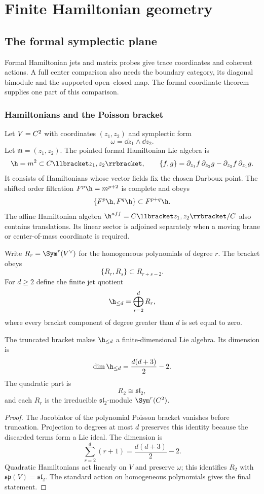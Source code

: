 \part{Finite Hamiltonian geometry}

\chapter{The formal symplectic plane}
\begin{summarybox}
Formal Hamiltonian jets and matrix probes give trace coordinates and coherent actions. A full center comparison also needs the boundary category, its diagonal bimodule and the supported open--closed map. The formal coordinate theorem supplies one part of this comparison.
\end{summarybox}

\section{Hamiltonians and the Poisson bracket}
Let $V=C^2$ with coordinates $(z_1,z_2)$ and symplectic form
\[
 \omega=\dd z_1\wedge\dd z_2.
\]
Let $\mathfrak m=(z_1,z_2)$.  The pointed formal Hamiltonian Lie algebra is
\[
 \h=\mathfrak m^2\subset\C\llbracket z_1,z_2\rrbracket,
 \qquad
 \{f,g\}=\partial_{z_1}f\,\partial_{z_2}g-
          \partial_{z_2}f\,\partial_{z_1}g.
\]
It consists of Hamiltonians whose vector fields fix the chosen Darboux point.  The shifted order filtration $F^p\h=\mathfrak m^{p+2}$ is complete and obeys
\[
 \{F^p\h,F^q\h\}\subset F^{p+q}\h.
\]
The affine Hamiltonian algebra $\h^{\mathrm{aff}}=\C\llbracket z_1,z_2\rrbracket/\C$ also contains translations.  Its linear sector is adjoined separately when a moving brane or center-of-mass coordinate is required.

Write $R_r=\Sym^r(V^\vee)$ for the homogeneous polynomials of degree $r$.  The bracket obeys
\[
 \{R_r,R_s\}\subset R_{r+s-2}.
\]
For $d\ge2$ define the finite jet quotient
\[
 \h_{\le d}=\bigoplus_{r=2}^{d}R_r,
\]
where every bracket component of degree greater than $d$ is set equal to zero.

\begin{theorem}
The truncated bracket makes $\h_{\le d}$ a finite-dimensional Lie algebra.  Its dimension is
\[
 \dim\h_{\le d}=\frac{d(d+3)}2-2.
\]
The quadratic part is
\[
 R_2\cong\mathfrak{sl}_2,
\]
and each $R_r$ is the irreducible $\mathfrak{sl}_2$-module $\Sym^r(\C^2)$.
\end{theorem}
\begin{proof}
The Jacobiator of the polynomial Poisson bracket vanishes before truncation.  Projection to degrees at most $d$ preserves this identity because the discarded terms form a Lie ideal.  The dimension is
\[
 \sum_{r=2}^{d}(r+1)
 =\frac{d(d+3)}2-2.
\]
Quadratic Hamiltonians act linearly on $V$ and preserve $\omega$; this identifies $R_2$ with $\mathfrak{sp}(V)=\mathfrak{sl}_2$.  The standard action on homogeneous polynomials gives the final statement.
\end{proof}

